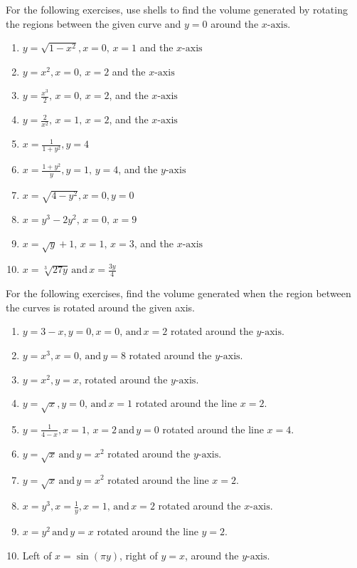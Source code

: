 \documentclass{exercises}
\begin{document}
For the following exercises, use shells to find the volume generated by rotating the regions between the given curve and $y=0$ around the $x\text{-axis}$.

\begin{enumerate}[resume]
\item $y=\sqrt{1-x^{2}},x=0,\,x=1$ and the $x\text{-axis}$
\item $y=x^{2},x=0,\,x=2$ and the $x\text{-axis}$
\item $y=\frac{x^{3}}{2},\,x=0,\,x=2$, and the $x\text{-axis}$
\item $y=\frac{2}{x^{2}},\,x=1,\,x=2$, and the $x\text{-axis}$
\item $x=\frac{1}{1+y^{2}},y=4$
\item $x=\frac{1+y^{2}}{y},y=1,\,y=4$, and the $y\text{-axis}$
\item $x=\sqrt{4-y^{2}},x=0,y=0$
\item $x=y^{3}-2y^{2},\,x=0,\,x=9$
\item $x=\sqrt{y}+1,\,x=1,\,x=3$, and the $x\text{-axis}$
\item $x=\sqrt[3]{27y}\,\text{and}\,x=\frac{3y}{4}$
\end{enumerate}

For the following exercises, find the volume generated when the region between the curves is rotated around the given axis.

\begin{enumerate}[resume]
\item $y=3-x,y=0,x=0,\,\text{and}\,x=2$ rotated around the $y\text{-axis}$.
\item $y=x^{3},x=0,\,\text{and}\,y=8$ rotated around the $y\text{-axis}$.
\item $y=x^{2},y=x$, rotated around the $y\text{-axis}$.
\item $y=\sqrt{x},y=0,\,\text{and}\,x=1$ rotated around the line $x=2$.
\item $y=\frac{1}{4-x},x=1,\,x=2\,\text{and}\,y=0$ rotated around the line $x=4$.
\item $y=\sqrt{x}\,\text{and}\,y=x^{2}$ rotated around the $y\text{-axis}$.
\item $y=\sqrt{x}\,\text{and}\,y=x^{2}$ rotated around the line $x=2$.
\item $x=y^{3},x=\frac{1}{y},x=1,\,\text{and}\,x=2$ rotated around the $x\text{-axis}$.
\item $x=y^{2}\,\text{and}\,y=x$ rotated around the line $y=2$.
\item \techrequired Left of $x=\sin(\pi y)$, right of $y=x$, around the $y\text{-axis}$.
\end{enumerate}
\end{document}
